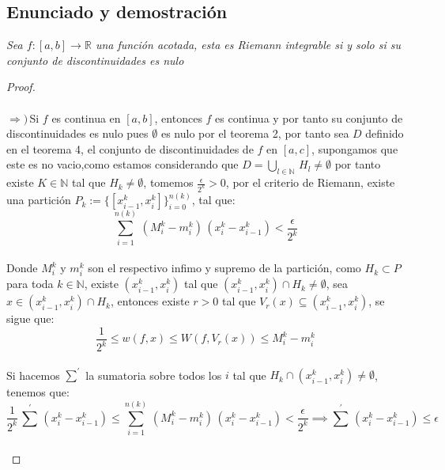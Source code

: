 \documentclass[11pt,letterpaper]{article}
\newcommand{\R}{\mathbb{R}}
\newcommand{\N}{\mathbb{N}}
\begin{document}
\subsection*{Enunciado y demostraci\'on}
\begin{tcolorbox}[
	title = \textcolor{black}{\textcolor{white}{Teorema de integrabilidad de Lebesgue }},]
\textit{Sea $f:[a,b]\rightarrow \R$ una funci\'on acotada, esta es Riemann integrable si y solo si su conjunto de discontinuidades es nulo}
\end{tcolorbox}
\begin{proof}\,\\
    \,\\
    $\Rightarrow)$\,Si $f$ es continua en $[a,b]$, entonces $f$ es continua y por tanto su conjunto de discontinuidades es nulo pues $\emptyset$ es nulo por el teorema 2, por
    tanto sea $D$ definido en el teorema 4, el conjunto de discontinuidades de $f$ en $[a,c]$, supongamos que este es no vacio,como estamos considerando que $D=\bigcup_{l\in \N}\,H_l\neq \emptyset$  por tanto existe $K\in \N$ tal que $H_k\neq \emptyset$, tomemos $\frac{\epsilon}{2^k}>0$, por el criterio de Riemann, existe una partici\'on $P_k:=\{[x^k_{i-1},x^k_{i}]\}_{i=0}^{n(k)}$, tal que:\,\\
    \begin{equation*}
        \sum_{i=1}^{n(k)}\,(M^k_i-m^k_i)\,(x^k_{i}-x^k_{i-1})<\frac{\epsilon}{2^k}
    \end{equation*}\,\\
    Donde $M^k_i$ y $m^k_i$ son el respectivo infimo y supremo de la partici\'on, como $H_k\subset P$ para toda $k\in \N$, existe $(x^k_{i-1},x^k_{i})$ tal que $(x^k_{i-1},x^k_{i})\cap H_k\neq \emptyset$, sea
    $x\in (x^k_{i-1},x^k_{i})\cap H_k$, entonces existe $r>0$ tal que $V_r(x)\subseteq (x^k_{i-1},x^k_{i})$, se sigue que:\,\\
    \begin{equation*}
        \frac{1}{2^k}\leq w(f,x) \leq W(f,V_r(x))\leq M^k_i-m^k_i
    \end{equation*}\,\\
    Si hacemos $\sum^{'}$ la sumatoria sobre todos los $i$ tal que $H_k\cap (x^k_{i-1},x^k_{i})\neq \emptyset$, tenemos que:\,\\
    \begin{equation*}
        \frac{1}{2^k}\,\sum^{'}\,(x^k_{i}-x^k_{i-1})\leq \sum_{i=1}^{n(k)}\,(M^k_i-m^k_i)\,(x^k_{i}-x^k_{i-1})<\frac{\epsilon}{2^k}\implies \sum^{'}\,(x^k_{i}-x^k_{i-1})\leq \epsilon
    \end{equation*}\,\\

\end{proof}
\end{document}
